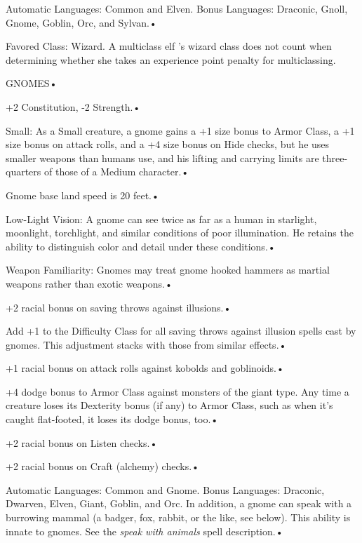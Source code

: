 \documentclass{article}
\begin{document}
Automatic Languages: Common and Elven. Bonus Languages: Draconic, Gnoll, Gnome, 
Goblin, Orc, and Sylvan.• 

\parindent=7pt
Favored Class: Wizard. A multiclass elf 's wizard class does not count when determining 
whether she takes an experience point penalty for multiclassing.

\vspace{12pt}
\parindent=0pt
{\LARGE{}GNOMES• }

\parindent=3pt
+2 Constitution, -2 Strength.• 

Small: As a Small creature, a gnome gains a +1 size bonus to Armor Class, a +1 
size bonus on attack rolls, and a +4 size bonus on Hide checks, but he uses smaller 
weapons than humans use, and his lifting and carrying limits are three-quarters 
of those of a Medium character.• 

\parindent=7pt
Gnome base land speed is 20 feet.• 

\parindent=3pt
Low-Light Vision: A gnome can see twice as far as a human in starlight, moonlight, 
torchlight, and similar conditions of poor illumination. He retains the ability 
to distinguish color and detail under these conditions.• 

Weapon Familiarity: Gnomes may treat gnome hooked hammers as martial weapons rather 
than exotic weapons.• 

\parindent=7pt
+2 racial bonus on saving throws against illusions.• 

\parindent=3pt
Add +1 to the Difficulty Class for all saving throws against illusion spells cast 
by gnomes. This adjustment stacks with those from similar effects.• 

+1 racial bonus on attack rolls against kobolds and goblinoids.• 

\parindent=7pt
+4 dodge bonus to Armor Class against monsters of the giant type. Any time a creature 
loses its Dexterity bonus (if any) to Armor Class, such as when it's caught flat-footed, 
it loses its dodge bonus, too.• 

\parindent=3pt
+2 racial bonus on Listen checks.• 

+2 racial bonus on Craft (alchemy) checks.• 

\parindent=7pt
Automatic Languages: Common and Gnome. Bonus Languages: Draconic, Dwarven, Elven, 
Giant, Goblin, and Orc. In addition, a gnome can speak with a burrowing mammal 
(a badger, fox, rabbit, or the like, see below). This ability is innate to gnomes. 
See the \textit{speak with animals }spell description.• 
\end{document}
